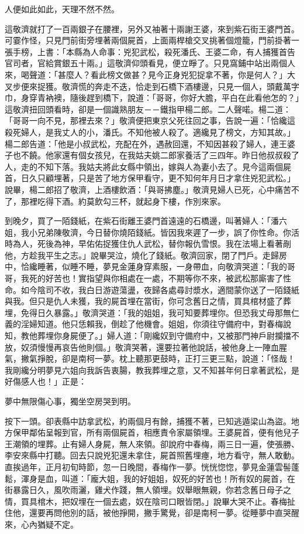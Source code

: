 人便如此如此，天理不然不然。

這敬濟就打了一百兩銀子在腰裡，另外又袖著十兩謝王婆，來到紫石街王婆門首。可霎作怪，只見門前街旁埋著兩個屍首，上面兩桿槍交叉挑著個燈籠，門前掛著一張手榜，上書：「本縣為人命事：兇犯武松，殺死潘氏、王婆二命，有人捕獲首告官司者，官給賞銀五十兩。」這敬濟仰頭看見，便立睜了。只見窩鋪中站出兩個人來，喝聲道：「甚麼人？看此榜文做甚？見今正身兇犯捉拿不著，你是何人？」大叉步便來捉獲。敬濟慌的奔走不迭，恰走到石橋下酒樓邊，只見一個人，頭戴萬字巾，身穿青衲襖，隨後趕到橋下，說道：「哥哥，你好大膽，平白在此看他怎的？」這敬濟扭回頭看時，卻是一個識熟朋友－－鐵指甲楊二郎。二人聲喏。楊二道： 「哥哥一向不見，那裡去來？」敬濟便把東京父死往回之事，告說一遍：「恰纔這殺死婦人，是我丈人的小，潘氏。不知他被人殺了。適纔見了榜文，方知其故。」 楊二郎告道：「他是小叔武松，充配在外，遇赦回還，不知因甚殺了婦人，連王婆子也不饒。他家還有個女孩兒，在我姑夫姚二郎家養活了三四年。昨日他叔叔殺了人，走的不知下落。我姑夫將此女縣中領出，嫁與人為妻小去了。見今這兩個屍首，日久只顧埋著，只是苦了地方保甲看守，更不知何年月日才拿住兇犯武松。」說畢，楊二郎招了敬濟，上酒樓飲酒：「與哥拂塵。」敬濟見婦人已死，心中痛苦不了，那裡吃得下酒。約莫飲勾三杯，就起身下樓，作別來家。

到晚夕，買了一陌錢紙，在紫石街離王婆門首遠遠的石橋邊，叫著婦人：「潘六姐，我小兄弟陳敬濟，今日替你燒陌錢紙。皆因我來遲了一步，誤了你性命。你活時為人，死後為神，早佑佑捉獲住仇人武松，替你報仇雪恨。我在法場上看著剮他，方趁我平生之志。」說畢哭泣，燒化了錢紙。敬濟回家，閉了門戶。走歸房中，恰纔睡著，似睡不睡，夢見金蓮身穿素服，一身帶血，向敬濟哭道：「我的哥哥，我死的好苦也！實指望與你相處在一處，不期等你不來，被武松那廝害了性命。如今陰司不收，我白日游遊蕩盪，夜歸各處尋討漿水，適間蒙你送了一陌錢紙與我。但只是仇人未獲，我的屍首埋在當街，你可念舊日之情，買具棺材盛了葬埋，免得日久暴露。」敬濟哭道：「我的姐姐，我可知要葬埋你。但恐我丈母那無仁義的淫婦知道。他只恁賴我，倒趁了他機會。姐姐，你須往守備府中，對春梅說知，教他葬埋你身屍便了。」婦人道：「剛纔奴到守備府中，又被那門神戶尉攔擋不放，奴須慢慢再哀告他則個。」敬濟哭著，還要拉著他說話，被他身上一陣血腥氣，撇氣掙脫，卻是南柯一夢。枕上聽那更鼓時，正打三更三點，說道：「怪哉！我剛纔分明夢見六姐向我訴告衷腸，教我葬埋之意，又不知甚年何日拿著武松，是好傷感人也！」正是：

夢中無限傷心事，獨坐空房哭到明。

按下一頭。卻表縣中訪拿武松，約兩個月有餘，捕獲不著，已知逃遁梁山為盜。地方保甲鄰佑呈報到官，所有兩個屍首，相應責令家屬領埋。王婆屍首，便有他兒子王潮領的埋葬。止有婦人身屍，無人來領。卻說府中春梅，兩三日一遍，使張勝、李安來縣中打聽。回去只說兇犯還未拿住，屍首照舊埋瘞，地方看守，無人敢動。直挨過年，正月初旬時節，忽一日晚間，春梅作一夢。恍恍惚惚，夢見金蓮雲髻蓬鬆，渾身是血，叫道：「龐大姐，我的好姐姐，奴死的好苦也！所有奴的屍首，在街暴露日久，風吹雨灑，雞犬作踐，無人領埋。奴舉眼無親，你若念舊日母子之情，買具棺木，把奴埋在一個去處，奴在陰司口眼皆閉。」說畢大哭不止。春梅扯住他，還要再問他別的話，被他掙開，撇手驚覺，卻是南柯一夢。從睡夢中直哭醒來，心內猶疑不定。

